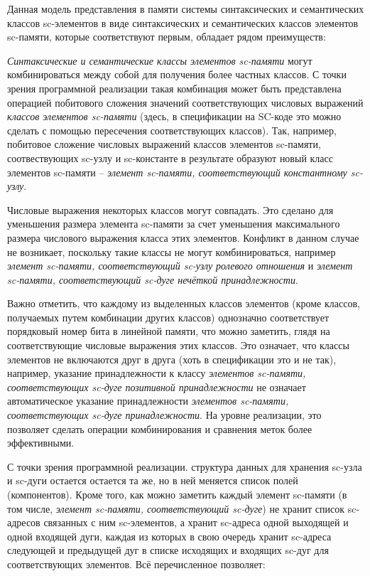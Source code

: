 Данная модель представления в памяти системы синтаксических и семантических классов sc-элементов в виде синтаксических и семантических классов элементов sc-памяти, которые соответствуют первым, обладает рядом преимуществ:
\begin{textitemize}
    \item \textit{Синтаксические и семантические классы элементов sc-памяти} могут комбинироваться между собой для получения более частных классов. С точки зрения программной реализации такая комбинация может быть представлена операцией побитового сложения значений соответствующих числовых выражений \textit{классов элементов sc-памяти} (здесь, в спецификации на SC-коде это можно сделать с помощью пересечения соответствующих классов). Так, например, побитовое сложение числовых выражений классов элементов sc-памяти, соотвествующих sc-узлу и sc-константе в результате образуют новый класс элементов sc-памяти -- \textit{элемент sc-памяти, соответствующий константному sc-узлу}.
    \item Числовые выражения некоторых классов могут совпадать. Это сделано для уменьшения размера элемента sc-памяти за счет уменьшения максимального размера числового выражения класса этих элементов. Конфликт в данном случае не возникает, поскольку такие классы не могут комбинироваться, например \textit{элемент sc-памяти, соответствующий sc-узлу ролевого отношения} и \textit{элемент sc-памяти, соответствующий sc-дуге нечёткой принадлежности}.
    \item Важно отметить, что каждому из выделенных классов элементов (кроме классов, получаемых путем комбинации других классов) однозначно соответствует порядковый номер бита в линейной памяти, что можно заметить, глядя на соответствующие числовые выражения этих классов. Это означает, что классы элементов не включаются друг в друга (хоть в спецификации это и не так), например, указание принадлежности к классу \textit{элементов sc-памяти, соответствующих sc-дуге позитивной принадлежности} не означает автоматическое указание принадлежности \textit{элементов sc-памяти, соответствующих sc-дуге принадлежности}. На уровне реализации, это позволяет сделать операции комбинирования и сравнения меток более эффективными.
\end{textitemize}

С точки зрения программной реализации. структура данных для хранения sc-узла и sc-дуги остается остается та же, но в ней меняется список полей (компонентов). Кроме того, как можно заметить каждый элемент sc-памяти (в том числе, \textit{элемент sc-памяти, соответствующий sc-дуге}) не хранит список sc-адресов связанных с ним sc-элементов, а хранит sc-адреса одной выходящей и одной входящей дуги, каждая из которых в свою очередь хранит sc-адреса следующей и предыдущей дуг в списке исходящих и входящих sc-дуг для соответствующих элементов. Всё перечисленное позволяет:

